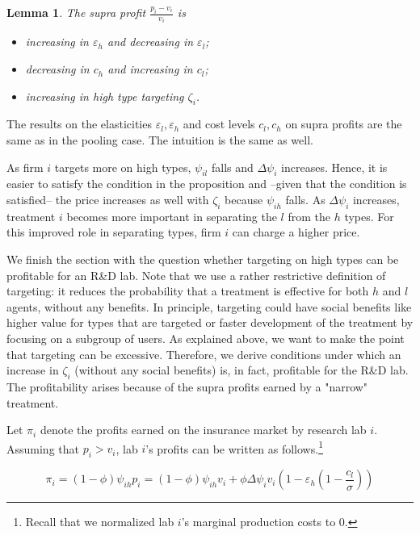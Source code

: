 \documentclass[12pt,english,a4paper]{article}
\newtheorem{lemma}{Lemma}
\begin{document}
\begin{lemma}\label{lem:compstatsep}
The supra profit $\frac{p_i-v_i}{v_i}$ is
\begin{itemize}
\item increasing in $\varepsilon_h$ and decreasing in $\varepsilon_l$;
\item decreasing in $c_h$ and increasing in $c_l$;
\item increasing in high type targeting $\zeta_i$.
\end{itemize}
\end{lemma}

The results on the elasticities \(\varepsilon_l, \varepsilon_h\) and cost levels \(c_l,c_h\) on supra profits are the same as in the pooling case. The intuition is the same as well.

As firm \(i\) targets more on high types, \(\psi_{il}\) falls and \(\Delta \psi_i\) increases. Hence, it is easier to satisfy the condition in the proposition and --given that the condition is satisfied-- the price increases as well with \(\zeta_i\) because \(\psi_{ih}\) falls. As \(\Delta \psi_i\) increases, treatment \(i\) becomes more important in separating the \(l\) from the \(h\) types. For this improved role in separating types, firm \(i\) can charge a higher price.

We finish the section with the question whether targeting on high types can be profitable for an R\&D lab. Note that we use a rather restrictive definition of targeting: it reduces the probability that a treatment is effective for both \(h\) and \(l\) agents, without any benefits. In principle, targeting could have social benefits like higher value for types that are targeted or faster development of the treatment by focusing on a subgroup of users. As explained above, we want to make the point that targeting can be excessive. Therefore, we derive conditions under which an increase in \(\zeta_i\) (without any social benefits) is, in fact, profitable for the R\&D lab. The profitability arises because of the supra profits earned by a "narrow" treatment.

Let \(\pi_i\) denote the profits earned on the insurance market by research lab \(i\). Assuming that \(p_i>v_i\), lab \(i\)'s profits can be written as follows.\footnote{Recall that we normalized lab \(i\)'s marginal production costs to 0.}

\begin{equation}
\label{eq:38}
\pi_i = (1-\phi)\psi_{ih}p_i=(1-\phi)\psi_{ih}v_i+\phi\Delta\psi_iv_i (1-\varepsilon_h(1-\frac{c_l}{\sigma}))
\end{equation}
\end{document}
